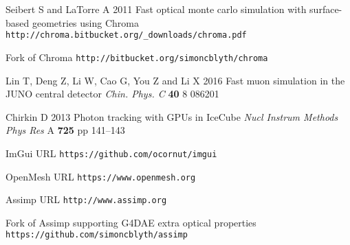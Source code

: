 \documentclass[a4paper]{jpconf}
\begin{document}
\begin{thebibliography}{9}
Seibert S and LaTorre A 
2011 
Fast optical monte carlo simulation with surface-based geometries using Chroma {\tt http://chroma.bitbucket.org/\_downloads/chroma.pdf}

Fork of Chroma {\tt http://bitbucket.org/simoncblyth/chroma}

Lin T, Deng Z, Li W, Cao G, You Z and Li X
2016
Fast muon simulation in the JUNO central detector
{\it Chin. Phys. C} {\bf 40} 8 086201

Chirkin D
2013
Photon tracking with GPUs in IceCube
{\it Nucl Instrum Methods Phys Res} A {\bf 725} pp 141--143
%

ImGui URL {\tt https://github.com/ocornut/imgui}

OpenMesh URL {\tt https://www.openmesh.org}

Assimp URL {\tt http://www.assimp.org}

Fork of Assimp supporting G4DAE extra optical properties {\tt https://github.com/simoncblyth/assimp}

\end{thebibliography}
\end{document}
